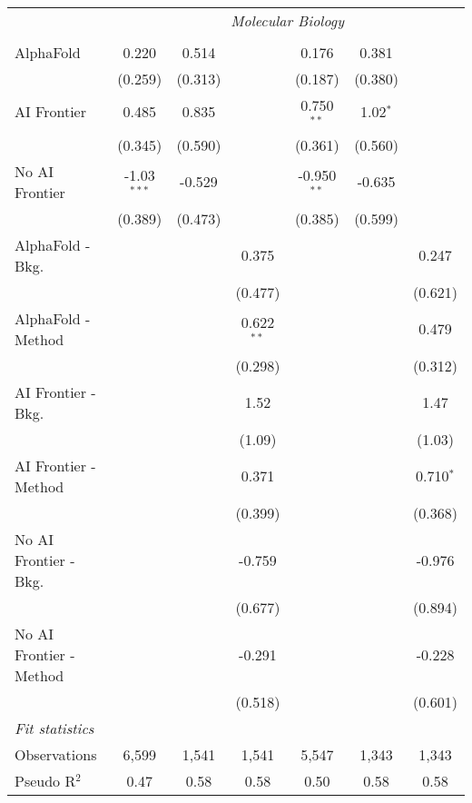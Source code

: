 \begin{tabular}{lcccccc}
 & \multicolumn{6}{c}{\textit{Molecular Biology}} \\ \\
   AlphaFold               & 0.220         & 0.514   &              & 0.176         & 0.381      &   \\   
                           & (0.259)       & (0.313) &              & (0.187)       & (0.380)    &   \\   
   AI Frontier             & 0.485         & 0.835   &              & 0.750$^{**}$  & 1.02$^{*}$ &   \\   
                           & (0.345)       & (0.590) &              & (0.361)       & (0.560)    &   \\   
   No AI Frontier          & -1.03$^{***}$ & -0.529  &              & -0.950$^{**}$ & -0.635     &   \\   
                           & (0.389)       & (0.473) &              & (0.385)       & (0.599)    &   \\   
   AlphaFold - Bkg.        &               &         & 0.375        &               &            & 0.247\\   
                           &               &         & (0.477)      &               &            & (0.621)\\   
   AlphaFold - Method      &               &         & 0.622$^{**}$ &               &            & 0.479\\   
                           &               &         & (0.298)      &               &            & (0.312)\\   
   AI Frontier - Bkg.      &               &         & 1.52         &               &            & 1.47\\   
                           &               &         & (1.09)       &               &            & (1.03)\\   
   AI Frontier - Method    &               &         & 0.371        &               &            & 0.710$^{*}$\\   
                           &               &         & (0.399)      &               &            & (0.368)\\   
   No AI Frontier - Bkg.   &               &         & -0.759       &               &            & -0.976\\   
                           &               &         & (0.677)      &               &            & (0.894)\\   
   No AI Frontier - Method &               &         & -0.291       &               &            & -0.228\\   
                           &               &         & (0.518)      &               &            & (0.601)\\   
   \midrule
   \emph{Fit statistics}\\
   Observations            & 6,599         & 1,541   & 1,541        & 5,547         & 1,343      & 1,343\\  
   Pseudo R$^2$            & 0.47          & 0.58    & 0.58         & 0.50          & 0.58       & 0.58\\  
   

\end{tabular}
